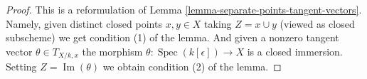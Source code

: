 \documentclass[10pt,a4paper]{amsart}
\theoremstyle{plain}
\theoremstyle{definition}
\theoremstyle{remark}
\numberwithin{equation}{subsection}
\def\Spec{\mathop{\mathrm{Spec}}}
\def\Im{\mathop{\mathrm{Im}}}
\begin{document}
\begin{proof}
This is a reformulation of
Lemma \ref{lemma-separate-points-tangent-vectors}.
Namely, given distinct closed points
$x, y \in X$ taking $Z = x \cup y$ (viewed as closed
subscheme) we get condition (1) of the lemma.
And given a nonzero tangent vector $\theta \in T_{X/k, x}$
the morphism $\theta : \Spec(k[\epsilon]) \to X$
is a closed immersion. Setting $Z = \Im(\theta)$
we obtain condition (2) of the lemma.
\end{proof}
\end{document}
